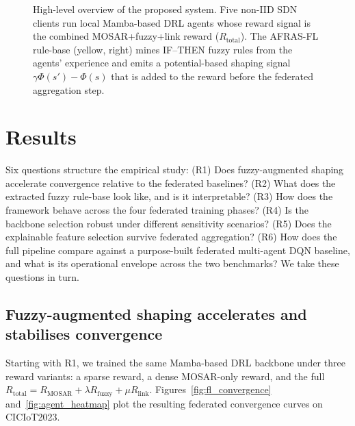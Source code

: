 \documentclass[journal]{IEEEtran}
\begin{document}
\begin{figure}[!htbp]
{%
  }
  \caption{High-level overview of the proposed system. Five non-IID SDN
  clients run local Mamba-based DRL agents whose reward signal is the
  combined MOSAR+fuzzy+link reward
  ($R_{\text{total}}$). The AFRAS-FL rule-base (yellow, right) mines
  IF--THEN fuzzy rules from the agents' experience and emits a
  potential-based shaping signal $\gamma\Phi(s')-\Phi(s)$ that is added
  to the reward before the federated aggregation step.}
  \label{fig:system_overview}
\end{figure}

\section{Results}\label{sec:results}

Six questions structure the empirical study: (R1) Does
fuzzy-augmented shaping accelerate convergence relative to the
federated baselines? (R2) What does the extracted fuzzy rule-base
look like, and is it interpretable? (R3) How does the framework
behave across the four federated training phases? (R4) Is the
backbone selection robust under different sensitivity scenarios?
(R5) Does the explainable feature selection survive federated
aggregation? (R6) How does the full pipeline compare against a
purpose-built federated multi-agent DQN baseline, and what is its
operational envelope across the two benchmarks? We take these
questions in turn.

\subsection{Fuzzy-augmented shaping accelerates and stabilises
convergence}\label{sec:r1_convergence}

Starting with R1, we trained the same Mamba-based DRL
backbone\cite{gu2023mamba,gu2022efficiently} under three reward
variants: a sparse reward, a dense MOSAR-only reward, and the full
$R_{\text{total}} = R_{\text{MOSAR}} + \lambda R_{\text{fuzzy}} +
\mu R_{\text{link}}$. Figures~\ref{fig:fl_convergence}
and~\ref{fig:agent_heatmap} plot the resulting federated
convergence curves on CICIoT2023.
\end{document}
